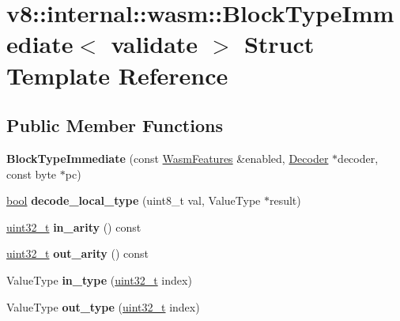 \hypertarget{structv8_1_1internal_1_1wasm_1_1BlockTypeImmediate}{}\section{v8\+:\+:internal\+:\+:wasm\+:\+:Block\+Type\+Immediate$<$ validate $>$ Struct Template Reference}
\label{structv8_1_1internal_1_1wasm_1_1BlockTypeImmediate}
\subsection*{Public Member Functions}
\begin{DoxyCompactItemize}
\item 
\mbox{\label{structv8_1_1internal_1_1wasm_1_1BlockTypeImmediate_abf5e44ef3dd4a27118d0d17108042bb9}} 
{\bfseries Block\+Type\+Immediate} (const \mbox{\hyperlink{structv8_1_1internal_1_1wasm_1_1WasmFeatures}{Wasm\+Features}} \&enabled, \mbox{\hyperlink{classv8_1_1internal_1_1wasm_1_1Decoder}{Decoder}} $\ast$decoder, const byte $\ast$pc)
\item 
\mbox{\label{structv8_1_1internal_1_1wasm_1_1BlockTypeImmediate_a50171bd7a7d164856ce628998a5d48de}} 
\mbox{\hyperlink{classbool}{bool}} {\bfseries decode\+\_\+local\+\_\+type} (uint8\+\_\+t val, Value\+Type $\ast$result)
\item 
\mbox{\label{structv8_1_1internal_1_1wasm_1_1BlockTypeImmediate_a7e799b905a0014d6c62650455ce5f6dd}} 
\mbox{\hyperlink{classuint32__t}{uint32\+\_\+t}} {\bfseries in\+\_\+arity} () const
\item 
\mbox{\label{structv8_1_1internal_1_1wasm_1_1BlockTypeImmediate_a7a03a06e0cfde1800459872f89d35282}} 
\mbox{\hyperlink{classuint32__t}{uint32\+\_\+t}} {\bfseries out\+\_\+arity} () const
\item 
\mbox{\label{structv8_1_1internal_1_1wasm_1_1BlockTypeImmediate_a2b9693a1ecfd1a976ab19a7b60bc3082}} 
Value\+Type {\bfseries in\+\_\+type} (\mbox{\hyperlink{classuint32__t}{uint32\+\_\+t}} index)
\item 
\mbox{\label{structv8_1_1internal_1_1wasm_1_1BlockTypeImmediate_ab7bd7390984082a761f007ca03e7eaff}} 
Value\+Type {\bfseries out\+\_\+type} (\mbox{\hyperlink{classuint32__t}{uint32\+\_\+t}} index)
\end{DoxyCompactItemize}

